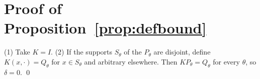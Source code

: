 \documentclass{article}
\begin{document}
\section{Proof of Proposition~\ref{prop:defbound}}
\label{app:defbound}
(1) Take $K=I$. (2) If the supports $S_\theta$ of the $P_\theta$ are disjoint,
define $K(x,\cdot)=Q_\theta$ for $x\in S_\theta$ and arbitrary elsewhere. Then
$KP_\theta=Q_\theta$ for every $\theta$, so $\delta=0$. \qed



\end{document}
